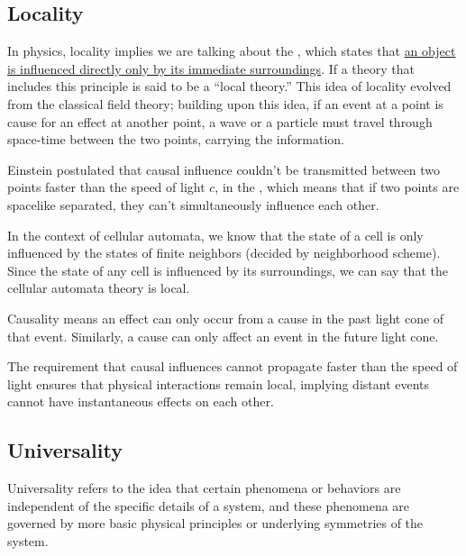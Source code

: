 \documentclass[11pt, oneside, listof=totoc]{scrbook}
\begin{document}
\subsection{Locality} \label{ssec: locality}

In physics, locality implies we are talking about the , which states that \uline{an object is influenced directly only by its immediate surroundings}. If a theory that includes this principle is said to be a ``local theory.'' This idea of locality evolved from the classical field theory; building upon this idea, if an event at a point is cause for an effect at another point, a wave or a particle must travel through space-time between the two points, carrying the information.

Einstein postulated that causal influence couldn't be transmitted between two points faster than the speed of light \(c\), in the , which means that if two points are spacelike separated, they can't simultaneously influence each other. %

In the context of cellular automata, we know that the state of a cell is only influenced by the states of finite neighbors (decided by neighborhood scheme). Since the state of any cell is influenced by its surroundings, we can say that the cellular automata theory is local.

\begin{remark}
    Causality means an effect can only occur from a cause in the past light cone of that event. Similarly, a cause can only affect an event in the future light cone.

    The requirement that causal influences cannot propagate faster than the speed of light ensures that physical interactions remain local, implying distant events cannot have instantaneous effects on each other.
\end{remark}

\subsection{Universality} \label{ssec: universality}
Universality refers to the idea that certain phenomena or behaviors are independent of the specific details of a system, and these phenomena are governed by more basic physical principles or underlying symmetries of the system.
\end{document}
